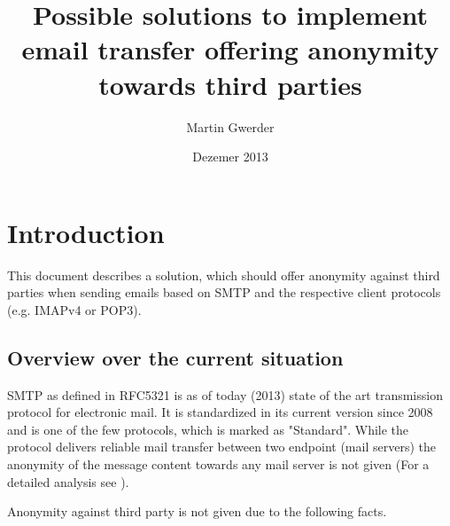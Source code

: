 \documentclass[11pt,a4paper]{book}
\begin{document}
\frontmatter

\title{Possible solutions to implement email transfer offering anonymity towards third parties}
\author{Martin Gwerder}
\date{Dezemer 2013}
\maketitle

\begin{comment}
\begin{abstracts}        %
FIXME abstract is still missing
\end{abstracts}

\begin{acknowledgements}      %
FIXME family
FIXME Professor
FIXME university
\\
I would like to acknowledge the thousands of individuals who have coded for the LaTeX project for free. It is due to their efforts that we can generate professionally typeset PDFs now.
\end{acknowledgements}
\end{comment}


\tableofcontents
\listoftables
\listoffigures

\mainmatter
\chapter{Introduction}
This document describes a solution, which should offer anonymity against third parties when sending emails based on SMTP and the respective client protocols (e.g. IMAPv4 or POP3).

\section{Overview over the current situation}
SMTP as defined in RFC5321\cite{RFC5321} is as of today (2013)  state of the art transmission protocol for electronic mail. It is standardized in its current version since 2008 and is one of the few protocols, which is marked as "Standard". While the protocol delivers reliable mail transfer between two endpoint (mail servers) the anonymity of the message content towards any mail server is not given (For a detailed analysis see ).\par

Anonymity against third party is not given due to the following facts.
\end{document}
